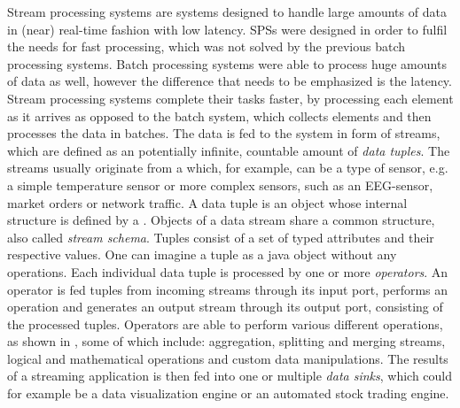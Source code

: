         \quad Stream processing systems are systems designed to handle large amounts of data in (near) real-time fashion with low latency.
        SPSs were designed in order to fulfil the needs for fast processing, which was not solved by the previous batch processing systems.
        Batch processing systems were able to process huge amounts of data as well, however the difference that needs to be emphasized is the latency.
        Stream processing systems complete their tasks faster, by processing each element as it arrives as opposed to the batch system, which collects elements 
        and then processes the data in batches.
        The data is fed to the system in form of streams, which are defined as an potentially infinite, countable amount of \textit{data tuples}. 
        The streams usually originate from a  which, for example, can be a type of sensor, e.g. a simple temperature sensor or more complex sensors, 
        such as an EEG-sensor, market orders or network traffic.
        A data tuple is an object whose internal structure is defined by a . 
        Objects of a data stream share a common structure, also called \textit{stream schema}.
        Tuples consist of a set of typed attributes and their respective values. One can imagine a tuple as a java object without any operations.\cite{fundamentals}
        Each individual data tuple is processed by one or more \textit{operators}.
        An operator is fed tuples from incoming streams through its input port, performs an operation and generates an output stream through its output port, 
        consisting of the processed tuples. Operators are able to perform various different operations, 
        as shown in \cite[p.49]{fundamentals}, some of which include: aggregation, splitting and merging streams, 
        logical and mathematical operations and custom data manipulations.
        The results of a streaming application is then fed into one or multiple \textit{data sinks}, which could for example be a data visualization engine 
        or an automated stock trading engine.
        
